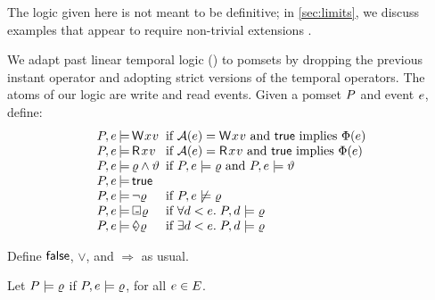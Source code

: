 The logic given here is not meant to be definitive; in
\textsection\ref{sec:limits}, we discuss \oota{} examples that appear to
require non-trivial extensions
\cite{DBLP:conf/esop/SvendsenPDLV18,DBLP:journals/pacmpl/ChakrabortyV19}.

We adapt past linear temporal logic (\pLTL)
\cite{Lichtenstein:1985:GP:648065.747612} to pomsets by dropping the previous
instant operator and adopting strict versions of the temporal operators.
The atoms of our logic are write and read events.
Given a pomset $P$ and event $e$, define:
\begin{displaymath}
  \renewcommand{\arraycolsep}{.2ex}
    \begin{array}{lrll}
      \aPS,\aEv &\models& \DW{\aLoc}{\aVal} &\text{ if } \labelingAct(\aEv) = \DW{\aLoc}{\aVal} \text{ and } \TRUE \text{ implies } \labelingForm(\aEv) \\
      \aPS,\aEv &\models& \DR{\aLoc}{\aVal} &\text{ if } \labelingAct(\aEv) = \DR{\aLoc}{\aVal} \text{ and } \TRUE \text{ implies } \labelingForm(\aEv) \\
      \aPS,\aEv &\models& \afo\land\bfo &\text{ if } \aPS,\aEv \models  \afo \text{ and } \aPS,\aEv \models  \bfo \\
      \aPS,\aEv &\models& \TRUE\\
      \aPS,\aEv &\models& \lnot\afo &\text{ if } \aPS,\aEv \not\models \afo \\
      \aPS,\aEv &\models& \always\afo &\text{ if } \forall \bEv \lt \aEv.\; \aPS,\bEv \models \afo\\
      \aPS,\aEv &\models& \once\afo &\text{ if } \exists \bEv \lt \aEv.\;  \aPS,\bEv \models \afo 
    \end{array} 
  \end{displaymath}

  Define $\mathsf{false}$, $\lor$, and $\Rightarrow$ as usual.

  Let $P \models \varrho$ if
  $P,e \models\varrho$, for all $e \in E$.

